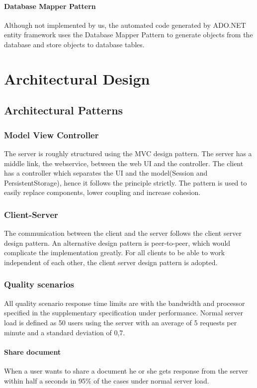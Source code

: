 \documentclass[a4paper,11pt,report]{report}
\begin{document}
\paragraph {Database Mapper Pattern}
Although not implemented by us, the automated code generated by ADO.NET entity framework uses the Database Mapper Pattern to generate objects from the database and store objects to database tables.

\section{Architectural Design}
\subsection{Architectural Patterns}
\subsubsection{Model View Controller}
The server is roughly structured using the MVC design pattern. The server has a middle link, the webservice, between the web UI and the controller. The client has a controller which separates the UI and the model(Session and PersistentStorage), hence it follows the principle strictly. The pattern is used to easily replace components, lower coupling and increase cohesion.
\subsubsection{Client-Server}
The communication between the client and the server follows the client server design pattern. An alternative design pattern is peer-to-peer, which would complicate the implementation greatly. For all clients to be able to work independent of each other, the client server design pattern is adopted.
\subsubsection{Quality scenarios }
All quality scenario response time limits are with the bandwidth and processor specified in the supplementary specification under performance. Normal server load is defined as 50 users using the server with an average of 5 requests per minute and a standard deviation of 0,7.
\paragraph{Share document}
When a user wants to share a document he or she gets response from the server within half a seconds in 95\% of the cases under normal server load.
\end{document}

